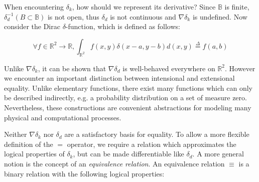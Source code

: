 \documentclass[11pt]{article}
\begin{document}
    When encountering $\delta_k$, how should we represent its derivative? Since $\mathbb{B}$ is finite, $\delta_d^{-1}(B\subset \mathbb{B})$ is not open, thus $\delta_d$ is not continuous and $\nabla\delta_k$ is undefined. Now consider the Dirac $\delta$-function, which is defined as follows: %

    $$
    \forall f \in \mathbb{R}^2 \rightarrow \mathbb{R}, \int_{\mathbb{R}^2} f(x,y)\delta(x-a,y-b)d(x, y) \overset{\Delta}{=} f(a,b)
    $$

    Unlike $\nabla\delta_k$, it can be shown that $\nabla\delta_d$ is well-behaved everywhere on $\mathbb{R}^2$. However we encounter an important distinction between intensional and extensional equality. Unlike elementary functions, there exist many functions which can only be described indirectly, e.g. a probability distribution on a set of measure zero. Nevertheless, these constructions are convenient abstractions for modeling many physical and computational processes.

    Neither $\nabla\delta_k$ nor $\delta_d$ are a satisfactory basis for equality. To allow a more flexible definition of the $=$ operator, we require a relation which approximates the logical properties of $\delta_k$, but can be made differentiable like $\delta_d$. A more general notion is the concept of an \textit{equivalence relation}. An equivalence relation $\equiv$ is a binary relation with the following logical properties:

\end{document}
